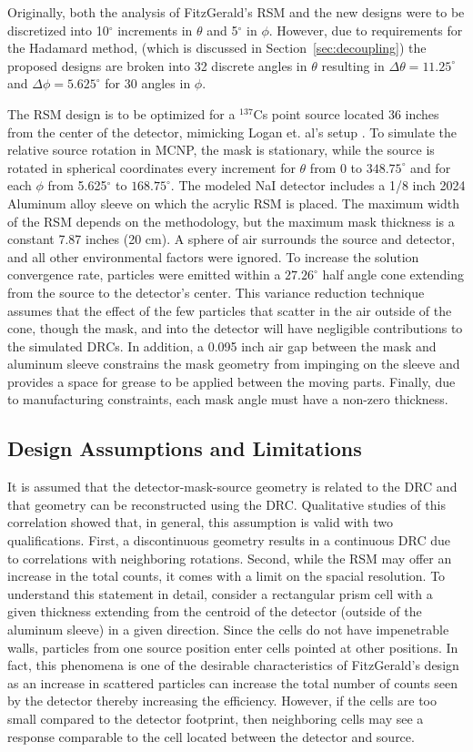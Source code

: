\documentclass[3p,times]{elsarticle}
\begin{document}
Originally, both the analysis of FitzGerald's RSM and the new designs were to be discretized into 10$^\circ$ increments in $\theta$ and 5$^\circ$ in $\phi$.  
However, due to requirements for the Hadamard method, (which is discussed in Section~\ref{sec:decoupling})
the proposed designs are broken into 32 discrete angles in $\theta$ resulting in $\Delta\theta=11.25^\circ$ and $\Delta\phi=5.625^\circ$ for 30 angles in $\phi$.

The RSM design is to be optimized for a $^{137}$Cs point source located 36 inches from the center of the detector, mimicking Logan et. al's setup \cite{Logan2017}.  
To simulate the relative source rotation in MCNP, the mask is stationary, while the source is rotated in spherical coordinates every increment for $\theta$ from 0 to $348.75^\circ$ and for each $\phi$ from 5.625$^\circ$ to $168.75^\circ$.  
The modeled NaI detector includes a 1/8 inch 2024 Aluminum alloy sleeve on which the acrylic RSM is placed. 
The maximum width of the RSM depends on the methodology, but the maximum mask thickness is a constant 7.87 inches (20 cm).  
A sphere of air surrounds the source and detector, and all other environmental factors were ignored.  
To increase the solution convergence rate, particles were emitted within a $27.26^\circ$ half angle cone extending from the source to the detector's center.  
This variance reduction technique assumes that the effect of the few particles that 
scatter in the air outside of the cone, though the mask, and into the detector will have negligible contributions to the simulated DRCs.   
In addition, a 0.095 inch air gap between the mask and aluminum sleeve constrains the mask geometry from impinging on the sleeve and provides a space for grease to be applied between the moving parts.
Finally, due to manufacturing constraints, each mask angle must have a non-zero thickness.

\subsection{Design Assumptions and Limitations}
It is assumed that the detector-mask-source geometry is related to the DRC and that geometry can be reconstructed using the DRC.
Qualitative studies of this correlation showed that, in general, this assumption is valid with two qualifications.  
First, a discontinuous geometry results in a continuous DRC due to correlations with neighboring rotations. 
Second, while the RSM may offer an increase in the total counts, it comes with a limit on the spacial resolution. 
To understand this statement in detail, consider a rectangular prism cell with a given thickness extending from the centroid of the detector (outside of the aluminum sleeve) in a given direction.
Since the cells do not have impenetrable walls, particles from one source position enter cells pointed at other positions.  
In fact, this phenomena is one of the desirable characteristics of FitzGerald's design as an increase in scattered particles can increase the total number of counts seen by the detector thereby increasing the efficiency.  
However, if the cells are too small compared to the detector footprint, then neighboring cells may see a response comparable to the cell located between the detector and source.
\end{document}
